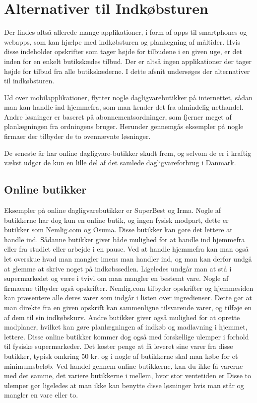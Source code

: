 \section{Alternativer til Indkøbsturen}
Der findes altså allerede mange applikationer, i form af apps til smartphones og webapps, som kan hjælpe med indkøbsturen og planlægning af måltider. Hvis disse indeholder opskrifter som tager højde for tilbudene i en given uge, er det inden for en enkelt butikskædes tilbud. Der er altså ingen applikationer der tager højde for tilbud fra alle butikskæderne. I dette afsnit undersøges der alternativer til indkøbsturen.

Ud over mobilapplikationer, flytter nogle dagligvarebutikker på internettet, sådan man kan handle ind hjemmefra, som man kender det fra almindelig nethandel.
Andre løsninger er baseret på abonnementsordninger, som fjerner meget af planlægningen fra ordningens bruger.
Herunder gennemgås eksempler på nogle firmaer der tilbyder de to ovennævnte løsninger.

De seneste år har online dagligvare-butikker skudt frem, og selvom de er i kraftig vækst udgør de kun en lille del af det samlede dagligvareforbrug i Danmark\citep{SOTA_MP1}.

\subsection{Online butikker}
Eksempler på online dagligvarebutikker er SuperBest og Irma\citep{SOTA_MP_SB, SOTA_MP_IRMA}.
Nogle af butikkerne har dog kun en online butik, og ingen fysisk modpart, dette er butikker som Nemlig.com og Osuma\citep{SOTA_MP_NEMLIG, SOTA_MP_OSUMA}.
Disse butikker kan gøre det lettere at handle ind.
Sådanne butikker giver både mulighed for at handle ind hjemmefra eller fra studiet eller arbejde i en pause.
Ved at handle hjemmefra kan man også let overskue hvad man mangler imens man handler ind, og man kan derfor undgå at glemme at skrive noget på indkøbssedlen.
Ligeledes undgår man at stå i supermarkedet og være i tvivl om man mangler en bestemt vare.
Nogle af firmaerne tilbyder også opskrifter.
Nemlig.com tilbyder opskrifter og hjemmesiden kan præsentere alle deres varer som indgår i listen over ingredienser.
Dette gør at man direkte fra en given opskrift kan sammenligne tilsvarende varer, og tilføje en af dem til sin indkøbskurv.
Andre butikker giver også mulighed for at oprette madplaner, hvilket kan gøre planlægningen af indkøb og madlavning i hjemmet, lettere.
Disse online butikker kommer dog også med forskellige ulemper i forhold til fysiske supermarkeder.
Det koster penge at få leveret sine varer fra disse butikker, typisk omkring 50 kr. og i nogle af butikkerne skal man købe for et minimumsbeløb.
Ved handel gennem online butikkerne, kan du ikke få varerne med det samme, det variere butikkerne i mellem, hvor stor ventetiden er
Disse to ulemper gør ligeledes at man ikke kan benytte disse løsninger hvis man står og mangler en vare eller to.


